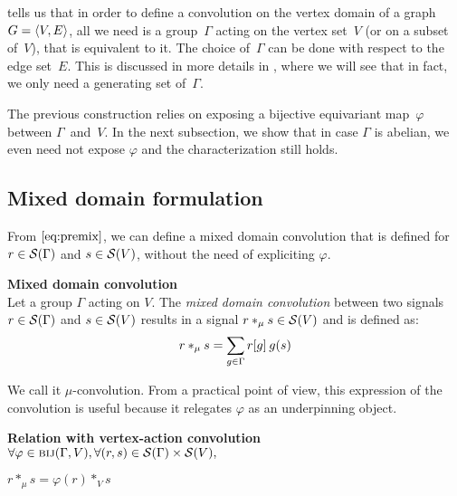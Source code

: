  tells us that in order to define a convolution on the vertex domain of a graph $\gve$, all we need is a group~$\Gamma$ acting on the vertex set~$V$ (or on a subset of~$V$), that is equivalent to it. The choice of~$\Gamma$ can be done with respect to the edge set~$E$. This is discussed in more details in , where we will see that in fact, we only need a generating set of~$\Gamma$.

The previous construction relies on exposing a bijective equivariant map~$\varphi$ between $\Gamma$~and~$V$. In the next subsection, we show that in case $\Gamma$ is abelian, we even need not expose $\varphi$ and the characterization still holds.

\subsection{Mixed domain formulation}

From $\eqref{eq:premix}$, we can define a mixed domain convolution \ie that is defined for $r \in \cs(\Gamma)$ and $s \in \cs(V)$, without the need of expliciting $\varphi$.

\begin{definition}\textbf{Mixed domain convolution}\\
Let a group $\Gamma$ acting on $V$.
The \emph{mixed domain convolution} between two signals $r \in \cs(\Gamma)$ and $s \in \cs(V)$ results in a signal $r \ast_\mu s \in \cs(V)$ and is defined as:
\begin{gather*}
r \ast_\mu s = \displaystyle \sum_{g \in \Gamma} r[g] \h{2} g(s)
\end{gather*}
\label{def:convm}
\end{definition}

We call it $\mu$-convolution. From a practical point of view, this expression of the convolution is useful because it relegates $\varphi$ as an underpinning object.%

\begin{lemma}\textbf{Relation with vertex-action convolution}\\
$\forall \varphi \in \bij(\Gamma, V), \forall (r,s) \in \cs(\Gamma) \times \cs(V),$\\
\centerline{$r \ast_\mu s = \varphi(r) \ast_{V} s$}
\label{lem:rel3m}
\end{lemma}


